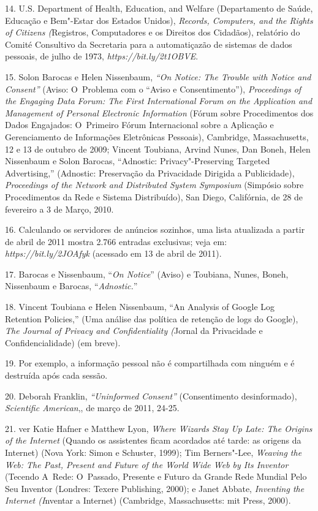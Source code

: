 \begin{Parskip}
14. U.S. Department of Health, Education, and Welfare (Departamento de
Saúde, Educação e Bem"-Estar dos Estados Unidos), \emph{Records,
Computers, and the Rights of Citizens (}Registros, Computadores e os
Direitos dos Cidadãos), relatório do Comité Consultivo da Secretaria
para a automatiçazão de sistemas de dados pessoais, de julho de 1973,
\emph{https://bit.ly/2t1OBVE}.

15. Solon Barocas e Helen Nissenbaum, \emph{``On Notice: The Trouble with
Notice and Consent''} (Aviso: O~Problema com o ``Aviso e
Consentimento''), \emph{Proceedings of the Engaging Data Forum: The
First International Forum on the Application and Management of Personal
Electronic Information} (Fórum sobre Procedimentos dos Dados Engajados:
O~Primeiro Fórum Internacional sobre a Aplicação e Gerenciamento de
Informações Eletrônicas Pessoais), Cambridge, Massachusetts, 12 e 13 de
outubro de 2009; Vincent Toubiana, Arvind Nunes, Dan Boneh, Helen
Nissenbaum e Solon Barocas, ``Adnostic: Privacy"-Preserving Targeted
Advertising,'' (Adnostic: Preservação da Privacidade Dirigida a
Publicidade), \emph{Proceedings of the Network and Distributed System
Symposium} (Simpósio sobre Procedimentos da Rede e Sistema Distribuído),
San Diego, Califórnia, de 28 de fevereiro a 3 de Março, 2010.

16. Calculando os servidores de anúncios sozinhos, uma lista atualizada a
partir de abril de 2011 mostra 2.766 entradas exclusivas; veja em:
\emph{https://bit.ly/2JOAfyk}
(acessado em 13 de abril de 2011).

17. Barocas e Nissenbaum, ``\emph{On Notice}'' (Aviso) e Toubiana, Nunes,
Boneh, Nissenbaum e Barocas, ``\emph{Adnostic.}''

18. Vincent Toubiana e Helen Nissenbaum, ``An Analysis of Google Log
Retention Policies,'' (Uma análise das política de retenção de logs do
Google), \emph{The Journal of Privacy and Confidentiality (}Jornal da
Privacidade e Confidencialidade) (em breve).

19. Por exemplo, a informação pessoal não é compartilhada com ninguém e é
destruída após cada sessão.

20. Deborah Franklin, \emph{``Uninformed Consent''} (Consentimento
desinformado), \emph{Scientific American},, de março de 2011, 24-25.

21. ver Katie Hafner e Matthew Lyon, \emph{Where Wizards Stay Up Late:
The Origins of the Internet} (Quando os assistentes ficam acordados até
tarde: as origens da Internet) (Nova York: Simon e Schuster, 1999); Tim
Berners"-Lee, \emph{Weaving the Web: The Past, Present and Future of the
World Wide Web by Its Inventor} (Tecendo A~Rede: O~Passado, Presente e
Futuro da Grande Rede Mundial Pelo Seu Inventor (Londres: Texere
Publishing, 2000); e Janet Abbate, \emph{Inventing the Internet
(I}nventar a Internet) (Cambridge, Massachusetts: mit Press, 2000).


\end{Parskip}
